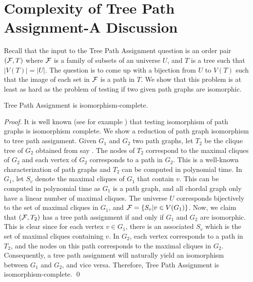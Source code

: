 \documentclass{llncs}
\def\cF{{\cal F}}
\begin{document}
\section{Complexity of Tree Path Assignment-A Discussion} \label{complexity}
Recall that the input to the Tree Path Assignment question is an order
pair $(\cF,T)$ where $\cF$ is a family of subsets of an universe $U$,
and $T$ is a tree such that $|V(T)| = |U|$.  The question is to come
up with a bijection from 
$U$ to $V(T)$ such that the image of each set in $\cF$ is a path in
$T$.  We show that this problem is at least as hard as the problem of
testing if two given path graphs are isomorphic.   
\begin{theorem} \label{thm:isocomp}
Tree Path Assignment is isomorphism-complete.
\end{theorem}
\begin{proof}
  It is well known (see for example \cite{kklv10}) that testing
  isomorphism of path graphs is isomorphism complete.  We show
  a reduction of path graph isomorphism to tree path
  assignment.  Given $G_1$ and $G_2$ two path graphs, let
  $T_2$ be the clique tree of $G_2$ obtained from say \cite{gav78}.
  The nodes of $T_2$ correspond to the maximal cliques of $G_2$ and
  each vertex of $G_2$ corresponds to a path in $G_2$.  This is a
  well-known characterization of path graphs and $T_2$ can be
  computed in polynomial time.  In $G_1$, let $S_v$ denote the maximal
  cliques of $G_1$ that contain $v$.  This can be computed in
  polynomial time as $G_1$ is a path graph, and all chordal graph only
  have a linear number of maximal cliques.  The universe $U$
  corresponds bijectively to the set of maximal cliques in $G_1$, and
  $\cF = \{S_v | v \in V(G_1)\}$.  Now, we claim that $(\cF, T_2)$ has
  a tree path assignment if and only if $G_1$ and $G_2$ are
  isomorphic.  This is clear since for each vertex $v \in G_1$, there
  is an associated $S_v$ which is the set of maximal cliques
  containing $v$.  In $G_2$, each vertex corresponds to a path in
  $T_2$, and the nodes on this path corresponds to the maximal cliques
  in $G_2$.  Consequently, a tree path assignment will naturally yield
  an isomorphism between $G_1$ and $G_2$, and vice versa.  Therefore,
  Tree Path Assignment is isomorphism-complete. \qed
\end{proof}
\end{document}
